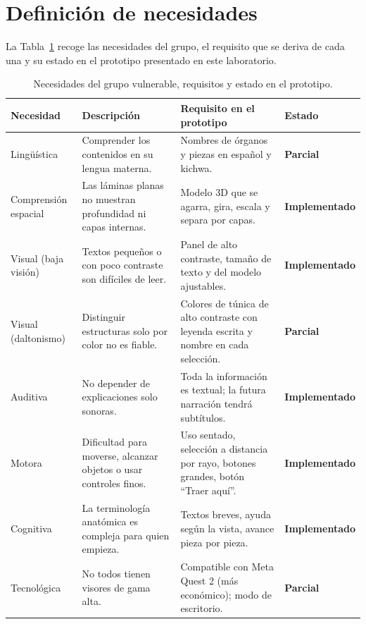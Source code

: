 \documentclass[11pt,a4paper]{article}
\newcommand{\hecho}{\textcolor{okverde}{\textbf{Implementado}}}
\newcommand{\parcial}{\textcolor{parcial}{\textbf{Parcial}}}
\begin{document}
\section{Definición de necesidades}
La Tabla~\ref{tab:necesidades} recoge las necesidades del grupo, el requisito que se deriva de cada una y su estado en el prototipo presentado en este laboratorio.

\begin{table}[!htbp]
\centering
\small
\renewcommand{\arraystretch}{1.3}
\begin{tabularx}{\textwidth}{
    >{\raggedright\arraybackslash}p{2.1cm}
    >{\raggedright\arraybackslash}X
    >{\raggedright\arraybackslash}X
    >{\raggedright\arraybackslash}p{2.6cm}}
\toprule
\textbf{Necesidad} & \textbf{Descripción} & \textbf{Requisito en el prototipo} & \textbf{Estado} \\
\midrule
Lingüística & Comprender los contenidos en su lengua materna. & Nombres de órganos y piezas en español y kichwa. & \parcial \\
Comprensión espacial & Las láminas planas no muestran profundidad ni capas internas. & Modelo 3D que se agarra, gira, escala y separa por capas. & \hecho \\
Visual (baja visión) & Textos pequeños o con poco contraste son difíciles de leer. & Panel de alto contraste, tamaño de texto y del modelo ajustables. & \hecho \\
Visual (daltonismo) & Distinguir estructuras solo por color no es fiable. & Colores de túnica de alto contraste con leyenda escrita y nombre en cada selección. & \parcial \\
Auditiva & No depender de explicaciones solo sonoras. & Toda la información es textual; la futura narración tendrá subtítulos. & \hecho \\
Motora & Dificultad para moverse, alcanzar objetos o usar controles finos. & Uso sentado, selección a distancia por rayo, botones grandes, botón ``Traer aquí''. & \hecho \\
Cognitiva & La terminología anatómica es compleja para quien empieza. & Textos breves, ayuda según la vista, avance pieza por pieza. & \hecho \\
Tecnológica & No todos tienen visores de gama alta. & Compatible con Meta Quest 2 (más económico); modo de escritorio. & \parcial \\
\bottomrule
\end{tabularx}
\caption{Necesidades del grupo vulnerable, requisitos y estado en el prototipo.}
\label{tab:necesidades}
\end{table}
\end{document}
